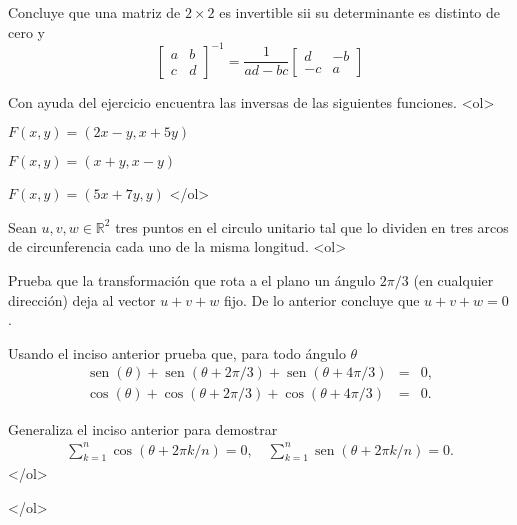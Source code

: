 \documentclass{article}
\theoremstyle{definition}
\newcommand{\sen}{\operatorname{sen}}
\begin{document}
	Concluye que una matriz de $2 \times 2$ es invertible sii su determinante es distinto de cero y
	$$
\left[
	\begin{array}{cc}
	a & b \\
	c & d
	\end{array}
	\right]^{-1} 
	=\frac{1}{ad-bc}\left[
	\begin{array}{cc}
	d & -b \\
	-c & a
	\end{array}
	\right]
	$$
	
	
	\item Con ayuda del ejercicio encuentra las inversas de las siguientes funciones.
	<ol>
	\item $F(x,y)=(2x-y, x+5y)$
	\item $F(x,y)=(x+y, x-y)$
	\item $F(x,y)=(5x+7y, y)$
	</ol>			
	
	
     \item Sean $u,v, w \in \mathbb{R}^2$ tres
       puntos en el circulo unitario tal que lo dividen en tres arcos de circunferencia cada uno de la misma longitud.
       <ol>
       \item Prueba que la transformación que rota a el plano un ángulo $2\pi/3$ (en cualquier dirección)
         deja al vector $u+v+w$ fijo. De lo anterior concluye que $u+v+w=0$.
       \item Usando el inciso anterior prueba que, para todo ángulo $\theta$
         \begin{eqnarray*}
         \sen(\theta)+\sen(\theta+2\pi/3)+\sen(\theta+4\pi/3)&=&0, \\
         \cos(\theta)+\cos(\theta+2\pi/3)+\cos(\theta+4\pi/3)&=&0 .
         \end{eqnarray*}

       \item Generaliza el inciso anterior para demostrar
         \begin{eqnarray*}
           \sum_{k=1}^n \cos(\theta+ 2\pi k/n)=0, \quad  \sum_{k=1}^n \sen(\theta +2\pi k /n)=0.
         \end{eqnarray*}
       </ol>



  </ol>

  
       
\end{document}

